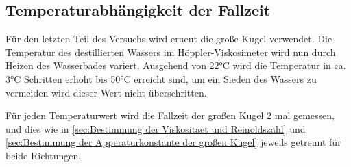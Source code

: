 \subsection{Temperaturabhängigkeit der Fallzeit}
\label{sec:Temperaturabhängigkeit der Fallzeit}
Für den letzten Teil des Versuchs wird erneut die große Kugel verwendet.
Die Temperatur des destillierten Wassers im Höppler-Viskosimeter wird nun durch Heizen des Wasserbades variert.
Ausgehend von 22°C wird die Temperatur in ca. 3°C Schritten erhöht bis 50°C erreicht sind, um ein Sieden des
Wassers zu vermeiden wird dieser Wert nicht überschritten.

Für jeden Temperaturwert wird die Fallzeit der großen Kugel 2 mal gemessen,
und dies wie in \autoref{sec:Bestimmung der Viskositaet und Reinoldszahl}
und \autoref{sec:Bestimmung der Apperaturkonstante der großen Kugel} jeweils getrennt für beide Richtungen.